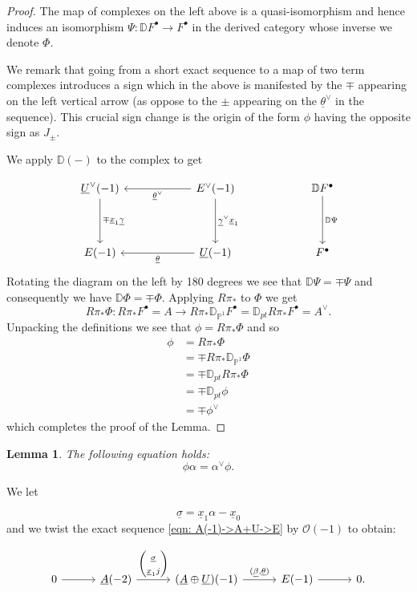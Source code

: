 \documentclass{amsart}
\newtheorem{lemma}[theorem]{Lemma}
\theoremstyle{definition}
\newcommand{\DD} {{\mathbb D}}
\newcommand{\PP}{\mathbb{P}}
\newcommand{\OO}{\mathcal{O}}
\newcommand{\UL}[1]{\underline{#1}}
\newcommand{\Rpistar}{R\pi_{*}}
\begin{document}
\begin{proof}
The map of complexes on the left above is a quasi-isomorphism and
hence induces an isomorphism $\Psi :\DD F^{\bullet}\to F^{\bullet}$
in the derived category whose inverse we denote $\Phi$.

We remark that going from a short exact sequence to a map of two term
complexes introduces a sign which in the above is manifested by the
$\mp$ appearing on the left vertical arrow (as oppose to the $\pm$
appearing on the $\UL{\theta}^{\vee}$ in the sequence). This crucial
sign change is the origin of the form $\phi$ having the opposite sign
as $J_{\pm}$.

We apply $\DD (-)$ to the complex to get

\[
\begin{tikzcd}[column sep=6em,row sep=4em]
  \UL{U}^{\vee }(-1)
    \arrow[d,"\mp\UL{x}_{1} \UL{\gamma}"]
  & E^{\vee}(-1)
    \arrow[d,"\UL{\gamma }^{\vee } \UL{x}_{1}"]
    \arrow[l,"\UL{\theta }^{\vee}"]
  & \DD F^{\bullet}
    \arrow[d,"\DD \Psi  "]
  \\
  E(-1)
  & \UL{U}(-1)
    \arrow[l,"\UL{\theta }"]
  & F^{\bullet}
\end{tikzcd}
\]
Rotating the diagram on the left by 180 degrees we see that $\DD \Psi
=\mp \Psi$ and consequently we have $\DD \Phi =\mp \Phi$. Applying
$\Rpistar $ to $\Phi$ we get
\[
\Rpistar \Phi : \Rpistar F^{\bullet} = A \to \Rpistar
\DD_{\PP^{1}}F^{\bullet}=\DD_{pt}\Rpistar F^{\bullet} = A^{\vee}.
\]
Unpacking the definitions we see that $\phi  = \Rpistar \Phi$ and so
\begin{align*}
\phi &=\Rpistar \Phi \\
&=\mp \Rpistar \DD_{\PP^{1}}\Phi \\
&=\mp \DD_{pt}\Rpistar \Phi \\
&=\mp \DD_{pt}\phi \\
&=\mp \phi^{\vee}
\end{align*}
which completes the proof of the Lemma.
\end{proof}
 
  
\begin{lemma}\label{lem: phi.alpha=alphavee.phi} The following
equation holds:
\[
\phi \alpha =\alpha^{\vee}\phi .
\]
\end{lemma}

\proof We let

\[
\UL{\sigma} = \UL{x}_{1}\alpha -\UL{x}_{0}
\]
and we twist the exact sequence \eqref{eqn: A(-1)->A+U->E} by $\OO
(-1)$ to obtain:

\[
\begin{tikzcd}[column sep=3em]
  0
    \arrow[r]
  & \UL{A}(-2)
    \arrow[r,"{%
      \begin{pmatrix}
        \UL{\sigma } \\
        \UL{x}_{1}j
      \end{pmatrix}
    }"]
  & (\UL{A}\oplus \UL{U})(-1)
    \arrow[r,"{(\UL{\beta},\UL{\theta})}"]
  & E(-1)
    \arrow[r]
  & 0.
\end{tikzcd}
\]
\end{document}
